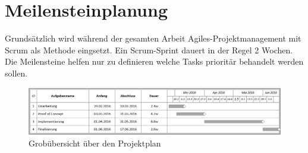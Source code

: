 \newpage

\section{Meilensteinplanung}
Grundsätzlich wird während der gesamten Arbeit Agiles-Projektmanagement mit Scrum als Methode eingsetzt. Ein Scrum-Sprint dauert in der Regel 2 Wochen. Die Meilensteine helfen nur zu definieren welche Tasks prioritär behandelt werden sollen.

\begin{figure}[ht]
	\centering
	\includegraphics[width=\textwidth]{images/projplan.png}
	\caption{Grobübersicht über den Projektplan}
	\label{Risk result}
\end{figure}



